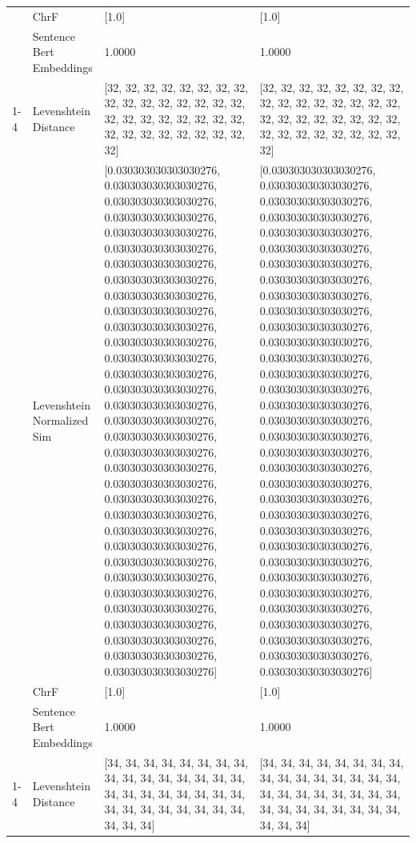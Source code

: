 \begin{tabular}{llll}
 & ChrF & [1.0] & [1.0] \\
 & Sentence Bert Embeddings & 1.0000 & 1.0000 \\
\cline{1-4}
\multirow[t]{4}{*}{Rituko rira tiriama ri’emosira kera ogose.} & Levenshtein Distance & [32, 32, 32, 32, 32, 32, 32, 32, 32, 32, 32, 32, 32, 32, 32, 32, 32, 32, 32, 32, 32, 32, 32, 32, 32, 32, 32, 32, 32, 32, 32, 32, 32] & [32, 32, 32, 32, 32, 32, 32, 32, 32, 32, 32, 32, 32, 32, 32, 32, 32, 32, 32, 32, 32, 32, 32, 32, 32, 32, 32, 32, 32, 32, 32, 32, 32] \\
 & Levenshtein Normalized Sim & [0.030303030303030276, 0.030303030303030276, 0.030303030303030276, 0.030303030303030276, 0.030303030303030276, 0.030303030303030276, 0.030303030303030276, 0.030303030303030276, 0.030303030303030276, 0.030303030303030276, 0.030303030303030276, 0.030303030303030276, 0.030303030303030276, 0.030303030303030276, 0.030303030303030276, 0.030303030303030276, 0.030303030303030276, 0.030303030303030276, 0.030303030303030276, 0.030303030303030276, 0.030303030303030276, 0.030303030303030276, 0.030303030303030276, 0.030303030303030276, 0.030303030303030276, 0.030303030303030276, 0.030303030303030276, 0.030303030303030276, 0.030303030303030276, 0.030303030303030276, 0.030303030303030276, 0.030303030303030276, 0.030303030303030276] & [0.030303030303030276, 0.030303030303030276, 0.030303030303030276, 0.030303030303030276, 0.030303030303030276, 0.030303030303030276, 0.030303030303030276, 0.030303030303030276, 0.030303030303030276, 0.030303030303030276, 0.030303030303030276, 0.030303030303030276, 0.030303030303030276, 0.030303030303030276, 0.030303030303030276, 0.030303030303030276, 0.030303030303030276, 0.030303030303030276, 0.030303030303030276, 0.030303030303030276, 0.030303030303030276, 0.030303030303030276, 0.030303030303030276, 0.030303030303030276, 0.030303030303030276, 0.030303030303030276, 0.030303030303030276, 0.030303030303030276, 0.030303030303030276, 0.030303030303030276, 0.030303030303030276, 0.030303030303030276, 0.030303030303030276] \\
 & ChrF & [1.0] & [1.0] \\
 & Sentence Bert Embeddings & 1.0000 & 1.0000 \\
\cline{1-4}
\multirow[t]{4}{*}{Omokungu noyomotiri ye'nyomba.} & Levenshtein Distance & [34, 34, 34, 34, 34, 34, 34, 34, 34, 34, 34, 34, 34, 34, 34, 34, 34, 34, 34, 34, 34, 34, 34, 34, 34, 34, 34, 34, 34, 34, 34, 34, 34, 34, 34] & [34, 34, 34, 34, 34, 34, 34, 34, 34, 34, 34, 34, 34, 34, 34, 34, 34, 34, 34, 34, 34, 34, 34, 34, 34, 34, 34, 34, 34, 34, 34, 34, 34, 34, 34] \\

\end{tabular}
